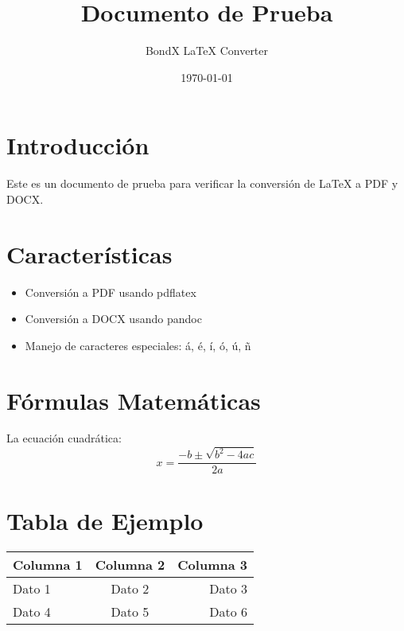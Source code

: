\documentclass{article}
\title{Documento de Prueba}
\author{BondX LaTeX Converter}
\date{\today}
\begin{document}
\maketitle

\section{Introducción}
Este es un documento de prueba para verificar la conversión de LaTeX a PDF y DOCX.

\section{Características}
\begin{itemize}
    \item Conversión a PDF usando pdflatex
    \item Conversión a DOCX usando pandoc
    \item Manejo de caracteres especiales: á, é, í, ó, ú, ñ
\end{itemize}

\section{Fórmulas Matemáticas}
La ecuación cuadrática:
\[
    x = \frac{-b \pm \sqrt{b^2 - 4ac}}{2a}
\]

\section{Tabla de Ejemplo}
\begin{tabular}{|l|c|r|}
    \hline
    Columna 1 & Columna 2 & Columna 3 \\
    \hline
    Dato 1 & Dato 2 & Dato 3 \\
    Dato 4 & Dato 5 & Dato 6 \\
    \hline
\end{tabular}
\end{document}
